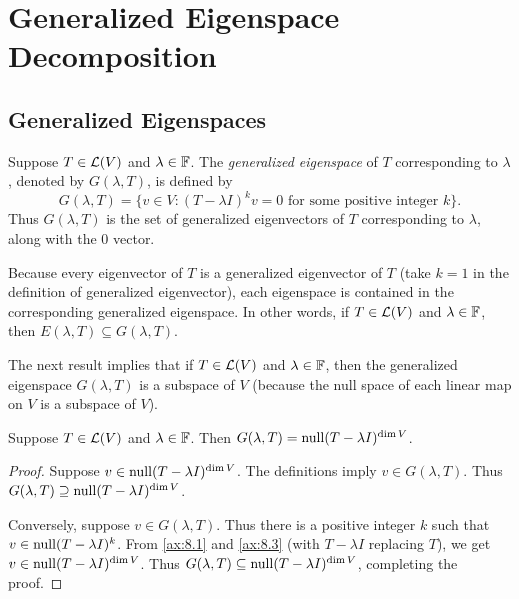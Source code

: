 \DeclareRobustCommand\axeqnum[1]{\refstepcounter{theorem}\label{ax:#1}}
\section{Generalized Eigenspace Decomposition}

\subsection{Generalized Eigenspaces}

\begin{definition}\label{ax:8.19}
Suppose $T\in\mathcal{L}(V)$ and $\lambda\in\mathbb{F}$. The \emph{generalized eigenspace} of
$T$ corresponding to $\lambda$, denoted by $G(\lambda,T)$, is defined by
\[ G(\lambda,T) = \{v\in V : (T-\lambda I)^kv=0 \text{ for some positive
   integer } k\}. \]
Thus $G(\lambda,T)$ is the set of generalized eigenvectors of $T$ corresponding
to $\lambda$, along with the $0$ vector.
\end{definition}

Because every eigenvector of $T$ is a generalized eigenvector of $T$ (take
$k=1$ in the definition of generalized eigenvector), each eigenspace is
contained in the corresponding generalized eigenspace. In other words, if
$T\in\mathcal{L}(V)$ and $\lambda\in\mathbb{F}$, then $E(\lambda,T)\subseteq G(\lambda,T)$.

The next result implies that if $T\in\mathcal{L}(V)$ and $\lambda\in\mathbb{F}$, then the
generalized eigen\-space $G(\lambda,T)$ is a subspace of $V$ (because the null
space of each linear map on $V$ is a subspace of $V$).

\begin{result}\label{ax:8.20}
Suppose $T\in\mathcal{L}(V)$ and $\lambda\in\mathbb{F}$. Then
$G(\lambda,T)=\operatorname{null}(T-\lambda I)^{\operatorname{dim} V}$.
\end{result}

\begin{proof}
Suppose $v\in\operatorname{null}(T-\lambda I)^{\operatorname{dim} V}$. The definitions imply
$v\in G(\lambda,T)$. Thus $G(\lambda,T)\supseteq\operatorname{null}(T-\lambda I)^{\operatorname{dim} V}$.

Conversely, suppose $v\in G(\lambda,T)$. Thus there is a positive integer $k$
such that $v\in\operatorname{null}(T-\lambda I)^k$. From \ref{ax:8.1} and \ref{ax:8.3} (with
$T-\lambda I$ replacing $T$), we get $v\in\operatorname{null}(T-\lambda I)^{\operatorname{dim} V}$. Thus
$G(\lambda,T)\subseteq\operatorname{null}(T-\lambda I)^{\operatorname{dim} V}$, completing the proof.
\end{proof}

